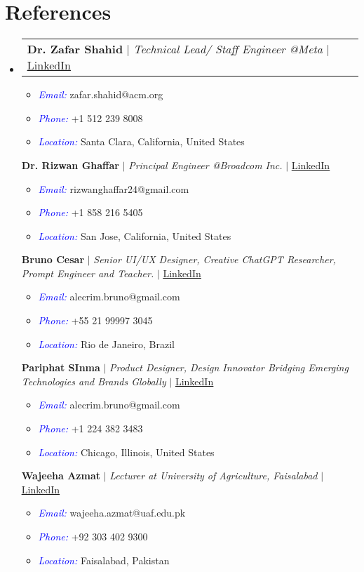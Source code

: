 \documentclass[letterpaper,11pt]{article}
\makeatletter
\newcommand{\resumeItem}[1]{
  \item\small{
    {#1 \vspace{-2pt}}
  }
}
\newcommand{\resumeProjectHeading}[2]{
    \item
    \begin{tabular*}{0.97\textwidth}{l@{\extracolsep{\fill}}r}
      \small#1 & #2 \\
    \end{tabular*}\vspace{-7pt}
}
\newcommand{\resumeSubHeadingListStart}{\begin{itemize}[leftmargin=0.15in, label={}]}
\newcommand{\resumeSubHeadingListEnd}{\end{itemize}}
\newcommand{\resumeItemListStart}{\begin{itemize}}
\newcommand{\resumeItemListEnd}{\end{itemize}\vspace{-5pt}}
\makeatother
\begin{document}
\section{\textbf{References}}
\resumeSubHeadingListStart
\resumeProjectHeading
{\textbf{{Dr. Zafar Shahid}} $|$ \emph{Technical Lead/ Staff Engineer @Meta} $|$ {\href{https://www.linkedin.com/in/zafarshahid/}{\underline{LinkedIn}}}}{}
\resumeItemListStart
\resumeItem{\textcolor{blue}{\itshape Email:} zafar.shahid@acm.org}
\resumeItem{\textcolor{blue}{\itshape Phone:} +1 512 239 8008}
\resumeItem{\textcolor{blue}{\itshape Location:} Santa Clara, California, United States}
\resumeItemListEnd
{\textbf{{Dr. Rizwan Ghaffar}} $|$ \emph{Principal Engineer @Broadcom Inc.} $|$ {\href{https://www.linkedin.com/in/rizwan-ghaffar-8283231a/}{\underline{LinkedIn}}}}{}
\resumeItemListStart
\resumeItem{\textcolor{blue}{\itshape Email:} rizwanghaffar24@gmail.com}
\resumeItem{\textcolor{blue}{\itshape Phone:} +1 858 216 5405}
\resumeItem{\textcolor{blue}{\itshape Location:} San Jose, California, United States}
\resumeItemListEnd
{\textbf{{Bruno Cesar}} $|$ \emph{Senior UI/UX Designer, Creative ChatGPT Researcher, Prompt Engineer and Teacher.} $|$ {\href{https://www.linkedin.com/in/brunoalecrim/}{\underline{LinkedIn}}}}{}
\resumeItemListStart
\resumeItem{\textcolor{blue}{\itshape Email:} alecrim.bruno@gmail.com}
\resumeItem{\textcolor{blue}{\itshape Phone:} +55 21 99997 3045}
\resumeItem{\textcolor{blue}{\itshape Location:} Rio de Janeiro, Brazil}
\resumeItemListEnd
{\textbf{{Pariphat SInma}} $|$ \emph{Product Designer, Design Innovator Bridging Emerging Technologies and Brands Globally} $|$ {\href{https://www.linkedin.com/in/pariphat-sinma/}{\underline{LinkedIn}}}}{}
\resumeItemListStart
\resumeItem{\textcolor{blue}{\itshape Email:} alecrim.bruno@gmail.com}
\resumeItem{\textcolor{blue}{\itshape Phone:} +1 224 382 3483}
\resumeItem{\textcolor{blue}{\itshape Location:} Chicago, Illinois, United States}
\resumeItemListEnd
{\textbf{{Wajeeha Azmat}} $|$ \emph{Lecturer at University of Agriculture, Faisalabad} $|$ {\href{https://www.linkedin.com/in/wajeehaazmat/}{\underline{LinkedIn}}}}{}
\resumeItemListStart
\resumeItem{\textcolor{blue}{\itshape Email:} wajeeha.azmat@uaf.edu.pk}
\resumeItem{\textcolor{blue}{\itshape Phone:} +92 303 402 9300}
\resumeItem{\textcolor{blue}{\itshape Location:} Faisalabad, Pakistan}
\resumeItemListEnd
\resumeSubHeadingListEnd

%

\end{document}
